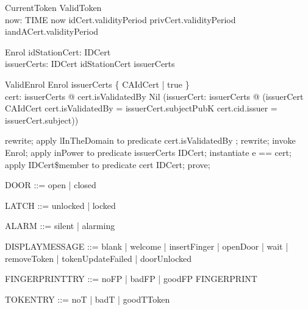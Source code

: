 \begin{schema}{CurrentToken}
  ValidToken\\
  now: TIME
\where
  now \in  idCert.validityPeriod \cap  privCert.validityPeriod \cap  iandACert.validityPeriod
\end{schema}

\begin{schema}{Enrol}
  idStationCert: IDCert\\
  issuerCerts: \power  IDCert
\where
  idStationCert \in  issuerCerts
\end{schema}

\begin{schema}{ValidEnrol}
  Enrol
\where
  issuerCerts \cap  \{  CAIdCert | true \} \neq  \emptyset\\
  \forall  cert: issuerCerts @ cert.isValidatedBy \neq  Nil \land  (\exists  issuerCert: issuerCerts @ (issuerCert \in  CAIdCert \land  \The cert.isValidatedBy = issuerCert.subjectPubK \land  cert.cid.issuer = issuerCert.subject))
\end{schema}

\begin{zproof}
rewrite;
apply lInTheDomain to predicate cert.isValidatedBy \in  \dom  \The;
rewrite;
invoke Enrol;
apply inPower to predicate issuerCerts \in  \power  IDCert;
instantiate e == cert;
apply IDCert\$member to predicate cert \in  IDCert;
prove;
\end{zproof}

\begin{zed}
DOOR ::= open | closed
\end{zed}

\begin{zed}
LATCH ::= unlocked | locked
\end{zed}

\begin{zed}
ALARM ::= silent | alarming
\end{zed}

\begin{zed}
DISPLAYMESSAGE ::= blank | welcome | insertFinger | openDoor | wait | removeToken | tokenUpdateFailed | doorUnlocked
\end{zed}

\begin{zed}
FINGERPRINTTRY ::= noFP | badFP | goodFP \ldata FINGERPRINT \rdata
\end{zed}

\begin{zed}
TOKENTRY ::= noT | badT | goodT\ldata Token\rdata
\end{zed}

